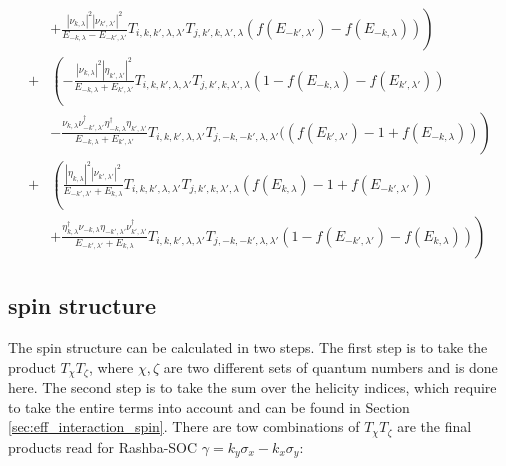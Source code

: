 \begin{align}
  & \left. + \frac{|\nu_{k,\lambda}|^2|\nu_{k',\lambda'}|^2}{E_{-k, \lambda} - E_{-k',\lambda'}}T_{i,k,k',\lambda, \lambda'}T_{j,k', k,\lambda', \lambda} (f(E_{-k',\lambda'}) -f(E_{-k,\lambda}))\right) \\ \nonumber
  +&\left( - \frac{|\nu_{k,\lambda}|^2|\eta_{k',\lambda'}|^2}{E_{-k, \lambda} + E_{k',\lambda'}}T_{i,k,k',\lambda, \lambda'}T_{j,k', k,\lambda', \lambda} (1-f(E_{-k, \lambda}) - f(E_{k',\lambda'})) \right. \\ \nonumber
  &\left. - \frac{\nu_{k,\lambda}\nu^{\dag}_{-k',\lambda'}\eta^{\dag}_{-k,\lambda}\eta_{k',\lambda'}}{E_{-k, \lambda} + E_{k',\lambda'}}T_{i,k,k',\lambda, \lambda'}T_{j,-k, -k' ,\lambda, \lambda'} ((f(E_{k',\lambda'}) - 1 + f(E_{-k, \lambda}))\right) \\ \nonumber
  +& \left( \frac{|\eta_{k,\lambda}|^2|\nu_{k',\lambda'}|^2}{E_{-k', \lambda'} + E_{k,\lambda}}T_{i,k,k',\lambda, \lambda'}T_{j,k',k,\lambda', \lambda} (f(E_{k,\lambda}) - 1 + f(E_{-k',\lambda'})) \right. \\ \nonumber 
  &\left. + \frac{\eta^{\dag}_{k,\lambda}\nu_{-k,\lambda}\eta_{-k',\lambda'}\nu^{\dag}_{k',\lambda'}}{E_{-k', \lambda'} + E_{k,\lambda}}T_{i,k,k',\lambda, \lambda'}T_{j,-k, -k' ,\lambda, \lambda'} ( 1- f(E_{-k',\lambda'}) - f(E_{k,\lambda}))\right)
\end{align}

\subsection{spin structure}
The spin structure can be calculated in two steps.\newline
The first step is to take the product $T_{\chi} T_{\zeta}$, where $\chi, \zeta$ are two different sets of quantum numbers and is done here. \newline
The second step is to take the sum over the helicity indices, which require to take the entire terms into account and can be found in Section \ref{sec:eff_interaction_spin}. \newline
There are tow combinations of $T_{\chi} T_{\zeta}$ are the final products read for Rashba-SOC $\gamma = k_y\sigma_x - k_x \sigma_y$:

